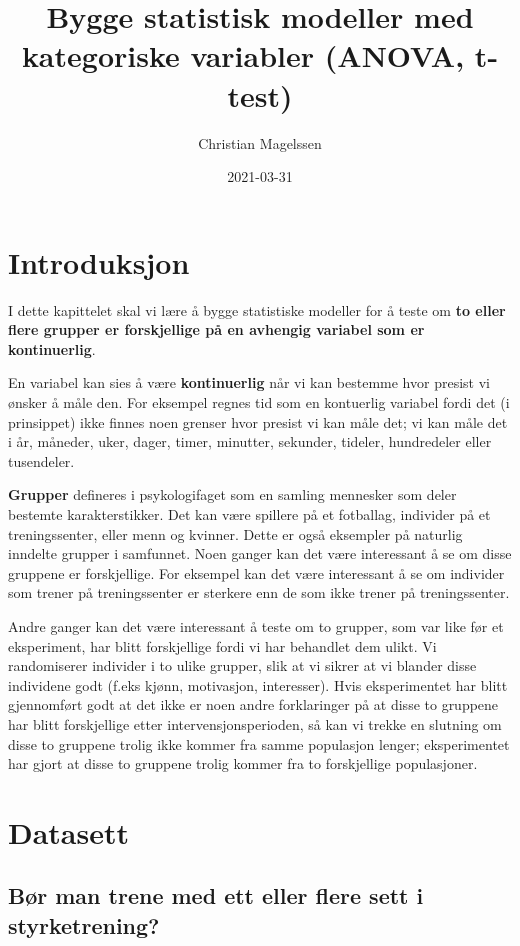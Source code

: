 \documentclass[
]{book}
\title{Bygge statistisk modeller med kategoriske variabler (ANOVA, t-test)}
\author{Christian Magelssen}
\date{2021-03-31}
\begin{document}
\maketitle

{
\setcounter{tocdepth}{1}
\tableofcontents
}
\hypertarget{intro}{%
\chapter{Introduksjon}\label{intro}}

I dette kapittelet skal vi lære å bygge statistiske modeller for å teste om \textbf{to eller flere grupper er forskjellige på en avhengig variabel som er kontinuerlig}.

En variabel kan sies å være \textbf{kontinuerlig} når vi kan bestemme hvor presist vi ønsker å måle den. For eksempel regnes tid som en kontuerlig variabel fordi det (i prinsippet) ikke finnes noen grenser hvor presist vi kan måle det; vi kan måle det i år, måneder, uker, dager, timer, minutter, sekunder, tideler, hundredeler eller tusendeler.

\textbf{Grupper} defineres i psykologifaget som en samling mennesker som deler bestemte karakterstikker. Det kan være spillere på et fotballag, individer på et treningssenter, eller menn og kvinner. Dette er også eksempler på naturlig inndelte grupper i samfunnet. Noen ganger kan det være interessant å se om disse gruppene er forskjellige. For eksempel kan det være interessant å se om individer som trener på treningssenter er sterkere enn de som ikke trener på treningssenter.

Andre ganger kan det være interessant å teste om to grupper, som var like før et eksperiment, har blitt forskjellige fordi vi har behandlet dem ulikt. Vi randomiserer individer i to ulike grupper, slik at vi sikrer at vi blander disse individene godt (f.eks kjønn, motivasjon, interesser). Hvis eksperimentet har blitt gjennomført godt at det ikke er noen andre forklaringer på at disse to gruppene har blitt forskjellige etter intervensjonsperioden, så kan vi trekke en slutning om disse to gruppene trolig ikke kommer fra samme populasjon lenger; eksperimentet har gjort at disse to gruppene trolig kommer fra to forskjellige populasjoner.

\hypertarget{datasett}{%
\chapter{Datasett}\label{datasett}}

\hypertarget{buxf8r-man-trene-med-ett-eller-flere-sett-i-styrketrening}{%
\section{Bør man trene med ett eller flere sett i styrketrening?}\label{buxf8r-man-trene-med-ett-eller-flere-sett-i-styrketrening}}
\end{document}
